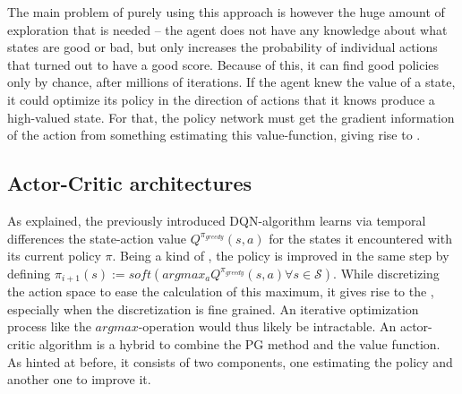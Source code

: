 \noindent The main problem of purely using this approach is however the huge amount of exploration that is needed -- the agent does not have any knowledge about what states are good or bad, but only increases the probability of individual actions that turned out to have a good score. Because of this, it can find good policies only by chance, after millions of iterations. If the agent knew the value of a state, it could optimize its policy in the direction of actions that it knows produce a high-valued state. For that, the policy network must get the gradient information of the action from something estimating this value-function, giving rise to .

\subsection{Actor-Critic architectures}

\label{sec:actorcrit}

As explained, the previously introduced DQN-algorithm learns via temporal differences the state-action value $Q^{\pi_{greedy}}(s,a)$ for the states it encountered with its current policy $\pi$. Being a kind of , the policy is improved in the same step by defining $\pi_{i+1}(s) := soft(argmax_a Q^{\pi_{greedy}}(s,a) \forall s \in \mathcal{S})$. While discretizing the action space to ease the calculation of this maximum, it gives rise to the , especially when the discretization is fine grained. An iterative optimization process like the $argmax$-operation would thus likely be intractable. An actor-critic algorithm is a hybrid to combine the PG method and the value function. As hinted at before, it consists of two components, one estimating the policy and another one to improve it.

